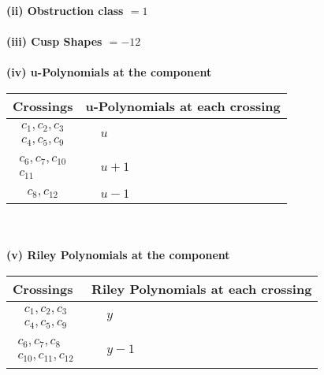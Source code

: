 \documentclass[1p]{elsarticle_modified}
\theoremstyle{definition}
\begin{document}
\flushleft \textbf{(ii) Obstruction class $= 1$}\\~\\
\flushleft \textbf{(iii) Cusp Shapes $= -12$}\\~\\
\newpage\renewcommand{\arraystretch}{1}
\flushleft \textbf{(iv) u-Polynomials at the component}\newline \\
\begin{tabular}{m{50pt}|m{274pt}}
Crossings & \hspace{64pt}u-Polynomials at each crossing \\
\hline $$\begin{aligned}c_{1},c_{2},c_{3}\\c_{4},c_{5},c_{9}\end{aligned}$$&$\begin{aligned}
&u
\end{aligned}$\\
\hline $$\begin{aligned}c_{6},c_{7},c_{10}\\c_{11}\end{aligned}$$&$\begin{aligned}
&u+1
\end{aligned}$\\
\hline $$\begin{aligned}c_{8},c_{12}\end{aligned}$$&$\begin{aligned}
&u-1
\end{aligned}$\\
\hline
\end{tabular}\\~\\
\newpage\renewcommand{\arraystretch}{1}
\flushleft \textbf{(v) Riley Polynomials at the component}\newline \\
\begin{tabular}{m{50pt}|m{274pt}}
Crossings & \hspace{64pt}Riley Polynomials at each crossing \\
\hline $$\begin{aligned}c_{1},c_{2},c_{3}\\c_{4},c_{5},c_{9}\end{aligned}$$&$\begin{aligned}
&y
\end{aligned}$\\
\hline $$\begin{aligned}c_{6},c_{7},c_{8}\\c_{10},c_{11},c_{12}\end{aligned}$$&$\begin{aligned}
&y-1
\end{aligned}$\\
\hline
\end{tabular}\\~\\
\end{document}
